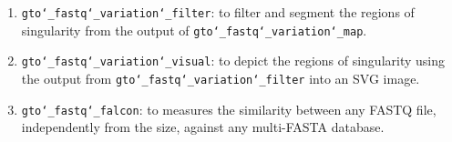 \begin{enumerate}
\item \texttt{gto\char`_fastq\char`_variation\char`_filter}: to filter and segment the regions of singularity from the output of \texttt{gto\char`_fastq\char`_variation\char`_map}.

\item \texttt{gto\char`_fastq\char`_variation\char`_visual}: to depict the regions of singularity using the output from \texttt{gto\char`_fastq\char`_variation\char`_filter} into an SVG image.

\item \texttt{gto\char`_fastq\char`_falcon}: to measures the similarity between any FASTQ file, independently from the size, against any multi-FASTA database.

\end{enumerate}





























